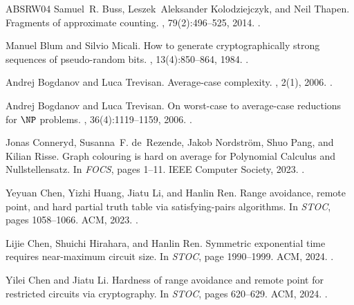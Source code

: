 \documentclass[10pt,a4paper]{article}
\theoremstyle{definition}
\theoremstyle{remark}
\begin{document}
\begin{thebibliography}{ABSRW04}
Samuel~R. Buss, Leszek~Aleksander Kolodziejczyk, and Neil Thapen.
\newblock Fragments of approximate counting.
, 79(2):496--525, 2014.
\newblock \href {https://doi.org/10.1017/JSL.2013.37}
  {}.

Manuel Blum and Silvio Micali.
\newblock How to generate cryptographically strong sequences of pseudo-random
  bits.
, 13(4):850--864, 1984.
\newblock \href {https://doi.org/10.1137/0213053} {}.

Andrej Bogdanov and Luca Trevisan.
\newblock Average-case complexity.
, 2(1), 2006.
\newblock \href {https://doi.org/10.1561/0400000004}
  {}.

Andrej Bogdanov and Luca Trevisan.
\newblock On worst-case to average-case reductions for {$\NP$} problems.
, 36(4):1119--1159, 2006.
\newblock \href {https://doi.org/10.1137/S0097539705446974}
  {}.

Jonas Conneryd, Susanna~F. de~Rezende, Jakob Nordström, Shuo Pang, and Kilian
  Risse.
\newblock Graph colouring is hard on average for {P}olynomial {C}alculus and
  {N}ullstellensatz.
\newblock In {\em FOCS}, pages 1--11. {IEEE} Computer Society, 2023.
\newblock \href {https://doi.org/10.1109/FOCS57990.2023.00007}
  {}.

Yeyuan Chen, Yizhi Huang, Jiatu Li, and Hanlin Ren.
\newblock Range avoidance, remote point, and hard partial truth table via
  satisfying-pairs algorithms.
\newblock In {\em {STOC}}, pages 1058--1066. {ACM}, 2023.
\newblock \href {https://doi.org/10.1145/3564246.3585147}
  {}.

Lijie Chen, Shuichi Hirahara, and Hanlin Ren.
\newblock Symmetric exponential time requires near-maximum circuit size.
\newblock In {\em {STOC}}, page 1990–1999. {ACM}, 2024.
\newblock \href {https://doi.org/10.1145/3618260.3649624}
  {}.

Yilei Chen and Jiatu Li.
\newblock Hardness of range avoidance and remote point for restricted circuits
  via cryptography.
\newblock In {\em {STOC}}, pages 620--629. {ACM}, 2024.
\newblock \href {https://doi.org/10.1145/3618260.3649602}
  {}.


\end{thebibliography}
\end{document}
